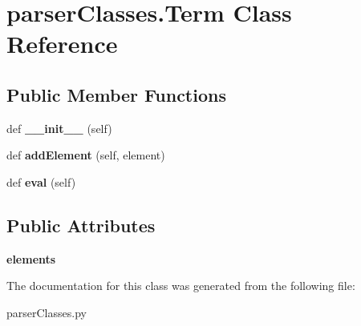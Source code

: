 \hypertarget{classparser_classes_1_1_term}{}\section{parser\+Classes.\+Term Class Reference}
\label{classparser_classes_1_1_term}
\subsection*{Public Member Functions}
\begin{DoxyCompactItemize}
\item 
\mbox{\label{classparser_classes_1_1_term_a6c4e5a1df9a4e150418f70d649bb0ccf}} 
def {\bfseries \+\_\+\+\_\+init\+\_\+\+\_\+} (self)
\item 
\mbox{\label{classparser_classes_1_1_term_a61959371502fbe2ff800e1c105cc12aa}} 
def {\bfseries add\+Element} (self, element)
\item 
\mbox{\label{classparser_classes_1_1_term_a59507b1f0f91fc82f9c152ee33a89251}} 
def {\bfseries eval} (self)
\end{DoxyCompactItemize}
\subsection*{Public Attributes}
\begin{DoxyCompactItemize}
\item 
\mbox{\label{classparser_classes_1_1_term_ac347a45be39cbf864849da398d22d2d2}} 
{\bfseries elements}
\end{DoxyCompactItemize}


The documentation for this class was generated from the following file\+:\begin{DoxyCompactItemize}
\item 
parser\+Classes.\+py\end{DoxyCompactItemize}

